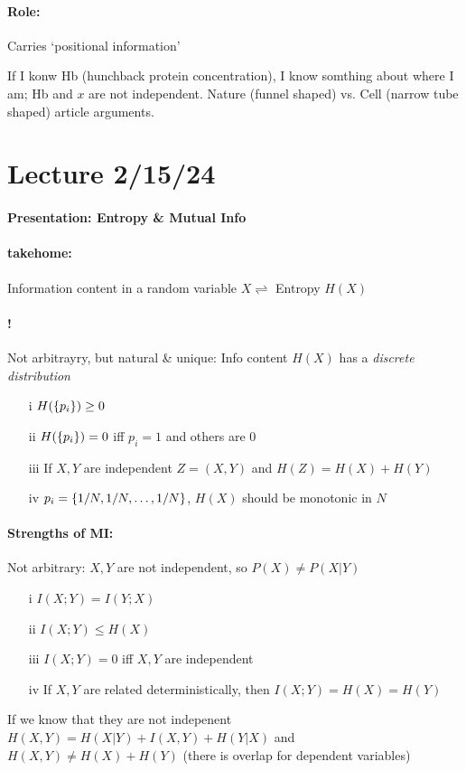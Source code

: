 \documentclass[../main.tex]{subfiles}
\begin{document}
\paragraph*{Role:} Carries `positional information'

If I konw Hb (hunchback protein concentration), I know somthing about where I am; Hb and $x$ are not
independent. Nature (funnel shaped) vs. Cell (narrow tube shaped) article arguments.

\newpage
\section*{Lecture 2/15/24}
\barh \vspace{10px}
\paragraph*{Presentation: Entropy \& Mutual Info}
\paragraph*{takehome:} Information content in a random variable $X \rightleftharpoons$ Entropy
$H(X)$
\paragraph*{!} Not arbitrayry, but natural \& unique: Info content $H(X)$ has a \emph{discrete 
distribution}
\begin{itemize}
    \item[i] $H(\qt{p_i}) \geq 0$
    \item[ii] $H(\qt{p_i}) = 0$ iff $p_i = 1$ and others are 0
    \item[iii] If $X,Y$ are independent $Z=(X,Y)$ and $H(Z) = H(X) + H(Y)$
    \item[iv] $p_i = \qt{1/N, 1/N, \dots, 1/N}$, $H(X)$ should be monotonic in $N$
\end{itemize}
\paragraph*{Strengths of MI:} Not arbitrary: $X,Y$ are not independent, so $P(X) \neq P(X|Y)$
\begin{itemize}
    \item[i] $I(X;Y) = I(Y;X)$
    \item[ii] $I(X;Y) \leq H(X)$
    \item[iii] $I(X;Y) = 0$ iff $X,Y$ are independent
    \item[iv] If $X,Y$ are related deterministically, then $I(X;Y) = H(X) = H(Y)$
\end{itemize}
If we know that they are not indepenent $H(X,Y) = H(X|Y) + I(X,Y) + H(Y|X)$ and
$H(X,Y) \neq H(X) + H(Y)$ (there is overlap for dependent variables)
\end{document}
